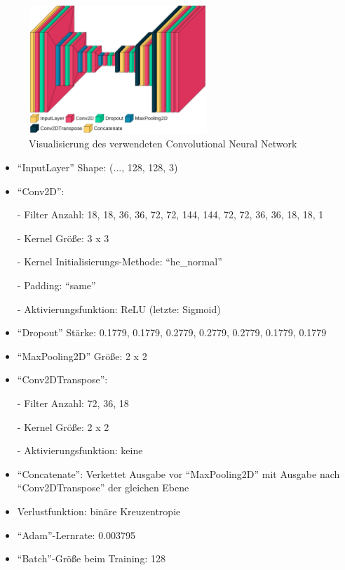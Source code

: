 \begin{figure}
    \centering
    \includegraphics[width=0.6\textwidth]{images/visual_model.png}
    \caption{Visualisierung des verwendeten Convolutional Neural Network}
    \label{fig:visual_model}
\end{figure}

\begin{itemize}
    \item \enquote{InputLayer} Shape: (..., 128, 128, 3) 
    \item \enquote{Conv2D}:
    \item[-] Filter Anzahl: 18, 18, 36, 36, 72, 72, 144, 144, 72, 72, 36, 36, 18, 18, 1
    \item[-] Kernel Größe: 3 x 3
    \item[-] Kernel Initialisierungs-Methode: \enquote{he\_normal}
    \item[-] Padding: \enquote{same} 
    \item[-] Aktivierungsfunktion: ReLU (letzte: Sigmoid)
    \item \enquote{Dropout} Stärke: 0.1779, 0.1779, 0.2779, 0.2779, 0.2779, 0.1779, 0.1779
    \item \enquote{MaxPooling2D} Größe: 2 x 2
    \item \enquote{Conv2DTranspose}:
    \item[-] Filter Anzahl: 72, 36, 18
    \item[-] Kernel Größe: 2 x 2
    \item[-] Aktivierungsfunktion: keine
    \item \enquote{Concatenate}: Verkettet Ausgabe vor \enquote{MaxPooling2D} mit Ausgabe nach \enquote{Conv2DTranspose} der gleichen Ebene
    \item Verlustfunktion: binäre Kreuzentropie
    \item \enquote{Adam}-Lernrate: 0.003795
    \item \enquote{Batch}-Größe beim Training: 128
\end{itemize}

